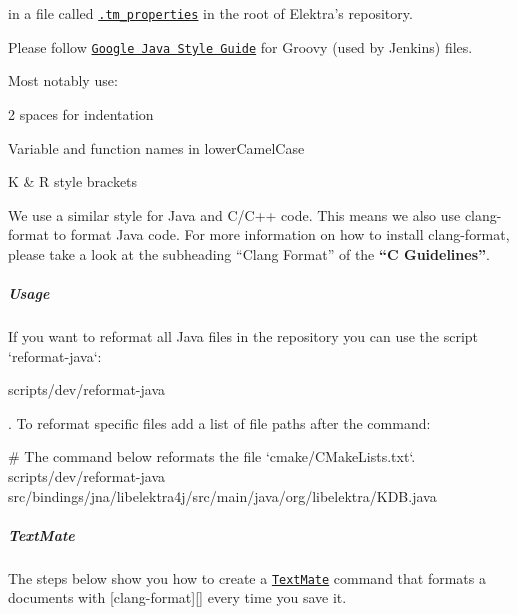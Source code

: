 in a file called \href{https://macromates.com/blog/2011/git-style-configuration}{\tt {\ttfamily .tm\+\_\+properties}} in the root of Elektra’s repository.

Please follow \href{https://google.github.io/styleguide/javaguide.html}{\tt Google Java Style Guide} for Groovy (used by Jenkins) files.

Most notably use\+:


\begin{DoxyItemize}
\item 2 spaces for indentation
\item Variable and function names in lower\+Camel\+Case
\item K \& R style brackets
\end{DoxyItemize}

We use a similar style for Java and C/\+C++ code. This means we also use {\ttfamily clang-\/format} to format Java code. For more information on how to install {\ttfamily clang-\/format}, please take a look at the subheading “\+Clang Format” of the {\bfseries “C Guidelines”}.

\label{invalid_invalid}%
%
\subparagraph*{Usage}

If you want to reformat all Java files in the repository you can use the script `reformat-\/java`\+:


\begin{DoxyCode}
scripts/dev/reformat-java
\end{DoxyCode}


. To reformat specific files add a list of file paths after the command\+:


\begin{DoxyCode}
# The command below reformats the file `cmake/CMakeLists.txt`.
scripts/dev/reformat-java src/bindings/jna/libelektra4j/src/main/java/org/libelektra/KDB.java
\end{DoxyCode}


\subparagraph*{Text\+Mate}

The steps below show you how to create a \href{https://macromates.com}{\tt Text\+Mate} command that formats a documents with \mbox{[}{\ttfamily clang-\/format}\mbox{]}\mbox{[}\mbox{]} every time you save it.


